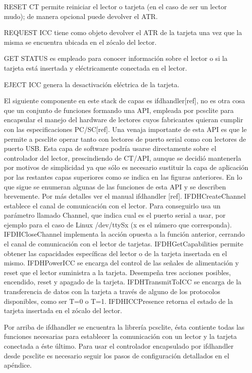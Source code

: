 RESET CT permite reiniciar el lector o tarjeta (en el caso de ser un lector mudo); de manera opcional puede devolver el ATR.

REQUEST ICC tiene como objeto devolver el ATR de la tarjeta una vez que la misma se encuentra ubicada en el zócalo del lector.

GET STATUS es empleado para conocer información sobre el lector o si la tarjeta está insertada y eléctricamente conectada en el lector. 

EJECT ICC genera la desactivación eléctrica de la tarjeta.

\bigskip
{}
El siguiente componente en este stack de capas es ifdhandler[ref], no es otra cosa que un conjunto de funciones formando una API, empleada por pcsclite para encapsular el manejo del hardware de  lectores cuyos fabricantes quieran cumplir con las especificaciones PC/SC[ref]. Una venaja importante de esta API es que le permite a pcsclite operar tanto con lectores de puerto serial como con lectores de puerto USB.
Esta capa de software podría usarse directamente sobre el controlador del lector, prescindiendo de CT/API, aunque se decidió mantenerla por motivos de simplicidad ya que sólo es necesario sustituir la capa de aplicación por las restantes capas superiores como se indica en las figuras anteriores.
En lo que sigue se enumeran algunas de las funciones de esta API y se describen brevemente. Por más detalles ver el manual ifdhandler [ref].
IFDHCreateChannel establece el canal de comunicación con el lector. Para conseguirlo usa un parámetro llamado Channel, que indica cual es el puerto serial a usar, por ejemplo para el caso de Linux /dev/ttySx (x es el número que corresponda).
IFDHCloseChannel implementa la acción opuesta a la función anterior, cerrando el canal de comunicación con el lector de tarjetas.
IFDHGetCapabilities permite obtener las capacidades específicas del lector o de la tarjeta insertada en el mismo.
IFDHPowerICC se encarga del control de las señales de alimentación y reset que el lector suministra a la tarjeta. Desempeña tres acciones posibles, encendido, reset y apagado de la tarjeta.
IFDHTransmitToICC se encarga de la transferencia de datos con la tarjeta a través de alguno de los protocolos disponibles, como ser T=0 o T=1.
IFDHICCPresence retorna el estado de la tarjeta insertada en el zócalo del lector.

\bigskip
{}
Por arriba de ifdhandler se encuentra la librería pcsclite, ésta contiente todas las funciones necesarias para establecer la comunicación con un lector y la tarjeta conectada a éste último. Para usar el controlador encapsulado por ifdhandler desde pcsclite es necesario seguir los pasos de configuración detallados en el apéndice.

